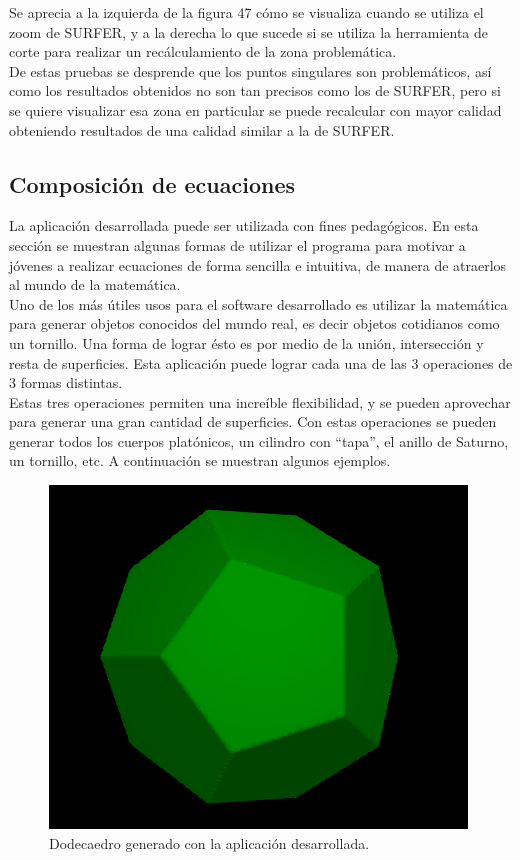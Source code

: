 \documentclass[12pt]{article}
\begin{document}
Se aprecia a la izquierda de la figura 47 cómo se visualiza cuando se utiliza el zoom de SURFER, y a la derecha lo que sucede si se utiliza la herramienta de corte para realizar un recálculamiento de la zona problemática. 
\\De estas pruebas se desprende que los puntos singulares son problemáticos, así como los resultados obtenidos no son tan precisos como los de SURFER, pero si se quiere visualizar esa zona en particular se puede recalcular con mayor calidad obteniendo resultados de una calidad similar a la de SURFER.

\subsection{Composición de ecuaciones}
La aplicación desarrollada puede ser utilizada con fines pedagógicos. En esta sección se muestran algunas formas de utilizar el programa para motivar a jóvenes a realizar ecuaciones de forma sencilla e intuitiva, de manera de atraerlos al mundo de la matemática.
\\Uno de los más útiles usos para el software desarrollado es utilizar la matemática para generar objetos conocidos del mundo real, es decir objetos cotidianos como un tornillo. Una forma de lograr ésto es por medio de la unión, intersección y resta de superficies. Esta aplicación puede lograr cada una de las 3 operaciones de 3 formas distintas.
\\Estas tres operaciones permiten una increíble flexibilidad, y se pueden aprovechar para generar una gran cantidad de superficies. Con estas operaciones se pueden generar todos los cuerpos platónicos, un cilindro con “tapa”, el anillo de Saturno, un tornillo, etc. A continuación se muestran algunos ejemplos.\\
\begin{figure}
\includegraphics[width=0.9\linewidth]{dodecaedro.png} 
\caption{Dodecaedro generado con la aplicación desarrollada.}
\label{fig:subim1}
\end{figure}
\end{document}

